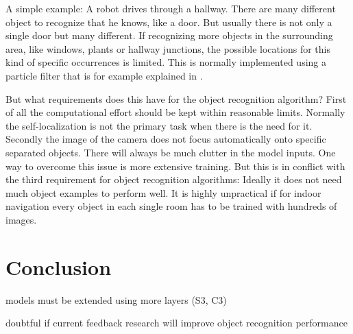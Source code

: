 	A simple example: A robot drives through a hallway. There are many different object to recognize that he knows, like a door. But usually there is not only a single door but many different. If recognizing more objects in the surrounding area, like windows, plants or hallway junctions, the possible locations for this kind of specific occurrences is limited. This is normally implemented using a particle filter that is for example explained in \citep{siagian2009biologically}.
	
	But what requirements does this have for the object recognition algorithm? First of all the computational effort should be kept within reasonable limits. Normally the self-localization is not the primary task when there is the need for it. Secondly the image of the camera does not focus automatically onto specific separated objects. There will always be much clutter in the model inputs. One way to overcome this issue is more extensive training. But this is in conflict with the third requirement for object recognition algorithms: Ideally it does not need much object examples to perform well. It is highly unpractical if for indoor navigation every object in each single room has to be trained with hundreds of images.
	
	
\chapter{Conclusion}

	
	models must be extended using more layers (S3, C3)
	
	doubtful if current feedback research will improve object recognition performance
	
	
	
	